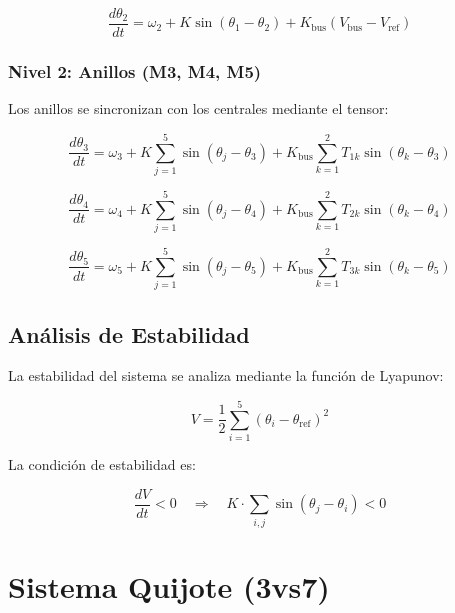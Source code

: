\documentclass[12pt,a4paper]{article}
\newcommand{\deriv}[2]{\frac{d#1}{d#2}}
\begin{document}
\begin{equation}
\deriv{\theta_2}{t} = \omega_2 + K \sin(\theta_1 - \theta_2) + K_{\text{bus}} (V_{\text{bus}} - V_{\text{ref}})
\end{equation}

\subsubsection{Nivel 2: Anillos (M3, M4, M5)}

Los anillos se sincronizan con los centrales mediante el tensor:

\begin{equation}
\deriv{\theta_3}{t} = \omega_3 + K \sum_{j=1}^{5} \sin(\theta_j - \theta_3) + K_{\text{bus}} \sum_{k=1}^{2} T_{1k} \sin(\theta_k - \theta_3)
\end{equation}

\begin{equation}
\deriv{\theta_4}{t} = \omega_4 + K \sum_{j=1}^{5} \sin(\theta_j - \theta_4) + K_{\text{bus}} \sum_{k=1}^{2} T_{2k} \sin(\theta_k - \theta_4)
\end{equation}

\begin{equation}
\deriv{\theta_5}{t} = \omega_5 + K \sum_{j=1}^{5} \sin(\theta_j - \theta_5) + K_{\text{bus}} \sum_{k=1}^{2} T_{3k} \sin(\theta_k - \theta_5)
\end{equation}

\subsection{Análisis de Estabilidad}

La estabilidad del sistema se analiza mediante la función de Lyapunov:

\begin{equation}
V = \frac{1}{2} \sum_{i=1}^{5} (\theta_i - \theta_{\text{ref}})^2
\end{equation}

La condición de estabilidad es:

\begin{equation}
\deriv{V}{t} < 0 \quad \Rightarrow \quad K \cdot \sum_{i,j} \sin(\theta_j - \theta_i) < 0
\end{equation}

\section{Sistema Quijote (3vs7)}
\end{document}
